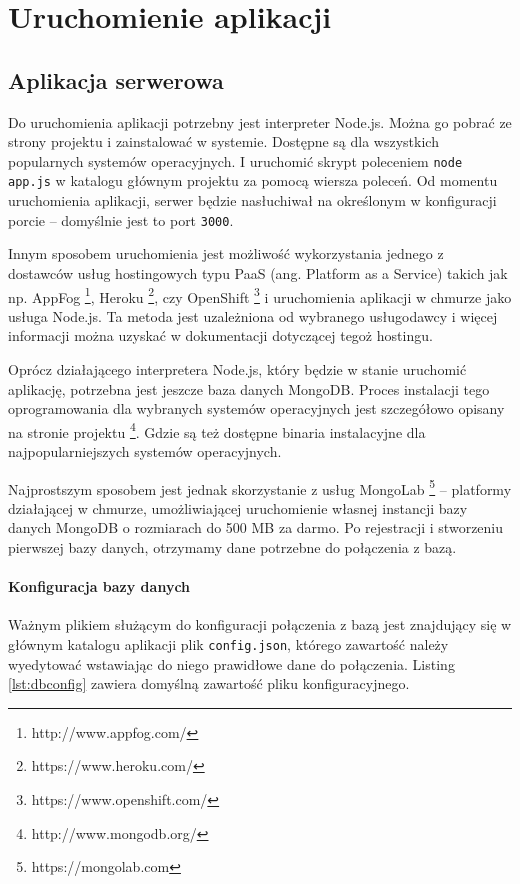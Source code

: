 \documentclass[twoside,a4paper,openright,12pt]{book}
\begin{document}
\chapter{Uruchomienie aplikacji}

\section{Aplikacja serwerowa}

Do uruchomienia aplikacji potrzebny jest interpreter Node.js. Można go pobrać ze strony projektu i zainstalować w systemie. Dostępne są dla wszystkich popularnych systemów operacyjnych. I uruchomić skrypt poleceniem \texttt{node app.js} w katalogu głównym projektu za pomocą wiersza poleceń.
Od momentu uruchomienia aplikacji, serwer będzie nasłuchiwał na określonym w konfiguracji porcie -- domyślnie jest to port \texttt{3000}.

Innym sposobem uruchomienia jest możliwość wykorzystania jednego z dostawców usług hostingowych typu PaaS (ang. Platform as a Service) takich jak np. AppFog \footnote{http://www.appfog.com/}, Heroku \footnote{https://www.heroku.com/}, czy OpenShift \footnote{https://www.openshift.com/} i uruchomienia aplikacji w chmurze jako usługa Node.js. Ta metoda jest uzależniona od wybranego usługodawcy i więcej informacji można uzyskać w dokumentacji dotyczącej tegoż hostingu.

Oprócz działającego interpretera Node.js, który będzie w stanie uruchomić aplikację, potrzebna jest jeszcze baza danych MongoDB.
Proces instalacji tego oprogramowania dla wybranych systemów operacyjnych jest szczegółowo opisany na stronie projektu \footnote{http://www.mongodb.org/}. Gdzie są też dostępne binaria instalacyjne dla najpopularniejszych systemów operacyjnych.

Najprostszym sposobem jest jednak skorzystanie z usług MongoLab \footnote{https://mongolab.com} -- platformy działającej w chmurze, umożliwiającej uruchomienie własnej instancji bazy danych MongoDB o rozmiarach do 500 MB za darmo.
Po rejestracji i stworzeniu pierwszej bazy danych, otrzymamy dane potrzebne do połączenia z bazą.

\subsubsection{Konfiguracja bazy danych}

Ważnym plikiem służącym do konfiguracji połączenia z bazą jest znajdujący się w głównym katalogu aplikacji plik \texttt{config.json}, którego zawartość należy wyedytować wstawiając do niego prawidłowe dane do połączenia.
Listing \ref{lst:dbconfig} zawiera domyślną zawartość pliku konfiguracyjnego.\\
\end{document}
